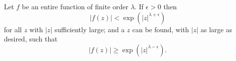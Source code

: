 Let $f$ be an entire function of finite order $\lambda$. If $\epsilon > 0$ then
$$|f(z)| < \exp(|z|^{\lambda+\epsilon})$$
for all $z$ with $|z|$ sufficiently large; and a $z$ can be found, with $|z|$ as large as desired, such that
$$|f(z)| \geq \exp(|z|^{\lambda-\epsilon}).$$
